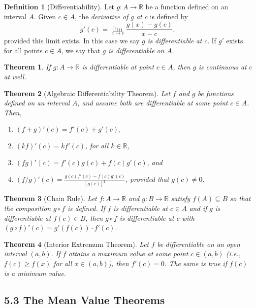 \documentclass{amsart}
\newtheorem*{theorem}{Theorem}
\theoremstyle{definition}
\newtheorem*{definition}{Definition}
\newcommand{\R}{\mathbb{R}}
\begin{document}
\begin{definition}[Differentiability]
  Let $g : A \to \R$ be a function defined on an interval $A$. Given $c \in A$,
  the \emph{derivative of $g$ at $c$} is defined by
  \[
    g'(c) = \lim_{x \to c} \frac{g(x) - g(c)}{x - c},
  \]
  provided this limit exists. In this case we say \emph{$g$ is differentiable at
  $c$}. If $g'$ exists for all points $c \in A$, we say that \emph{$g$ is
  differentiable on $A$}.
\end{definition}

\begin{theorem}
  If $g : A \to \R$ is differentiable at point $c \in A$, then $g$ is continuous
  at $c$ at well.
\end{theorem}

\begin{theorem}[Algebraic Differentiability Theorem]
  Let $f$ and $g$ be functions defined on an interval $A$, and assume both are
  differentiable at some point $c \in A$. Then,
  \begin{enumerate}[label={(\roman*)}]
    \item $(f + g)'(c) = f'(c) + g'(c)$,
    \item $(kf)'(c) = k f'(c)$, for all $k \in \R$,
    \item $(fg)'(c) = f'(c) g(c) + f(c) g'(c)$, and
    \item $(f/g)'(c) = \frac{g(c) f'(c) - f(c) g'(c)}{{[g(c)]}^2}$, provided
      that $g(c) \neq 0$.
  \end{enumerate}
\end{theorem}

\begin{theorem}[Chain Rule]
  Let $f : A \to \R$ and $g : B \to \R$ satisfy $f(A) \subseteq B$ so that the
  composition $g \circ f$ is defined. If $f$ is differentiable at $c \in A$ and
  if $g$ is differentiable at $f(c) \in B$, then $g \circ f$ is differentiable
  at $c$ with $(g \circ f)'(c) = g'(f(c)) \cdot f'(c)$.
\end{theorem}

\begin{theorem}[Interior Extremum Theorem]
  Let $f$ be differentiable on an open interval $(a, b)$. If $f$ attains a
  maximum value at some point $c \in (a, b)$ (i.e., $f(c) \ge f(x)$ for all $x
  \in (a, b)$), then $f'(c) = 0$. The same is true if $f(c)$ is a minimum value.
\end{theorem}

\subsection*{5.3 The Mean Value Theorems}
\end{document}
